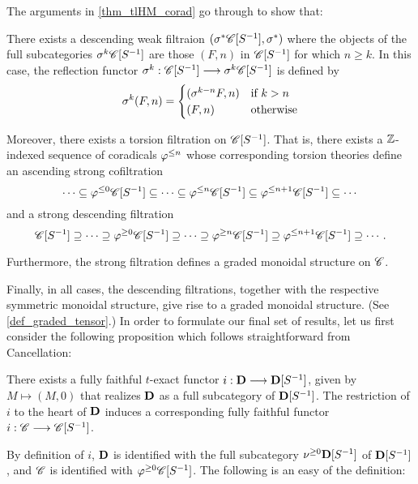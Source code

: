 The arguments in \ref{thm_tlHM_corad} go through to show that:

\begin{thm}
\label{thm_sum_heart_loc}
There exists a descending weak filtraion $(\sigma^{*}\mathscr{C}[{S}^{-1}], 
\sigma^{*})$ where the objects of the full subcategories 
$\sigma^{k}\mathscr{C}[{S}^{-1}]$ are those $(F, n)$ in $\mathscr{C}[{S}^{-1}]$ for 
which $n \geq k$. In this case, the reflection functor 
$\sigma^{k}: \mathscr{C}[{S}^{-1}] \longrightarrow \sigma^{k}\mathscr{C}[{S}^{-1}]$ is defined by 
\[
\sigma^{k}(F,n) = \begin{cases}
(\sigma^{k - n}F, n) &\textrm{if }k > n\\
(F, n)             &\textrm{otherwise}
\end{cases}
\]

Moreover, there exists a torsion filtration on $\mathscr{C}[{S}^{-1}]$. 
That is, there exists a $\mathbb{Z}$-indexed sequence of coradicals $\varphi^{\leq n}$ 
whose corresponding torsion theories define an ascending strong 
cofiltration
\[
\cdots \subseteq \varphi^{\leq 0}\mathscr{C}[{S}^{-1}] \subseteq \cdots \subseteq 
   \varphi^{\leq n}\mathscr{C}[{S}^{-1}] \subseteq \varphi^{\leq n + 1}\mathscr{C}[{S}^{-1}] 
   \subseteq \cdots
\]
and a strong descending filtration
\[
\mathscr{C}[{S}^{-1}] \supseteq \cdots \supseteq \varphi^{\geq 0}\mathscr{C}[{S}^{-1}] 
   \supseteq \cdots \supseteq \varphi^{\geq n}\mathscr{C}[{S}^{-1}] \supseteq 
   \varphi^{\leq n + 1}\mathscr{C}[{S}^{-1}] \supseteq \cdots.
\]

Furthermore, the strong filtration defines a graded monoidal 
structure on $\mathscr{C}$.
\end{thm}
\noproof

Finally, in all cases, the descending filtrations, together with
the respective symmetric monoidal structure, give rise to a
graded monoidal structure. (See \ref{def_graded_tensor}.) In order
to formulate our final set of results, let us first consider the
following proposition which follows straightforward from 
Cancellation:

\begin{prop}
There exists a fully faithful $t$-exact functor $i: \mathbf{D} \longrightarrow 
\mathbf{D}[S^{-1}]$, given by $M \mapsto (M, 0)$ that realizes $\mathbf{D}$ 
as a full subcategory of $\mathbf{D}[S^{-1}]$. The restriction of $i$ 
to the heart of $\mathbf{D}$ induces a corresponding fully faithful 
functor $i : \mathscr{C} \longrightarrow \mathscr{C}[{S}^{-1}]$.
\end{prop}

By definition of $i$, $\mathbf{D}$ is identified with the full 
subcategory $\nu^{\geq 0}\mathbf{D}[S^{-1}]$ of $\mathbf{D}[S^{-1}]$, and
$\mathscr{C}$ is identified with $\varphi^{\geq 0}\mathscr{C}[{S}^{-1}]$.
The following is an easy of the definition:

